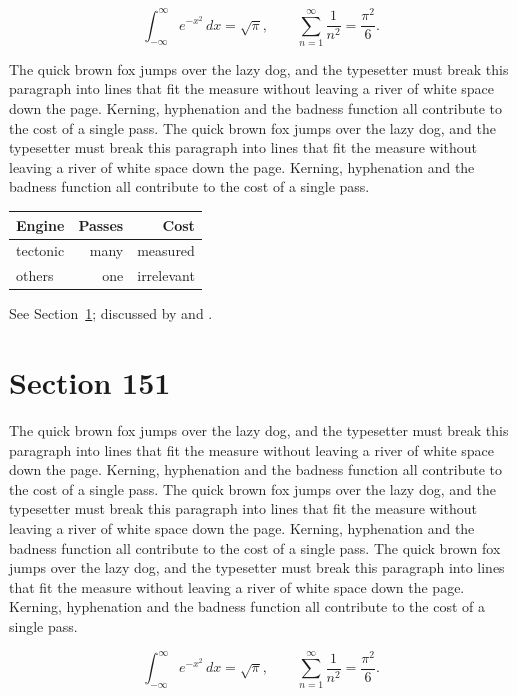 \documentclass{article}
\begin{document}
\begin{equation}\label{eq:150}
\int_{-\infty}^{\infty} e^{-x^{2}}\,dx = \sqrt{\pi}, \qquad
\sum_{n=1}^{\infty} \frac{1}{n^{2}} = \frac{\pi^{2}}{6}.
\end{equation}

The quick brown fox jumps over the lazy dog, and the typesetter must break this paragraph into lines that fit the measure without leaving a river of white space down the page. Kerning, hyphenation and the badness function all contribute to the cost of a single pass. The quick brown fox jumps over the lazy dog, and the typesetter must break this paragraph into lines that fit the measure without leaving a river of white space down the page. Kerning, hyphenation and the badness function all contribute to the cost of a single pass. 

\begin{center}
\begin{tabular}{lrr}
\toprule
Engine & Passes & Cost \\
\midrule
tectonic & many & measured \\
others & one & irrelevant \\
\bottomrule
\end{tabular}
\end{center}

See Section~\ref{sec:151}; discussed by \textcite{k1} and \textcite{l3}.
\section{Section 151}
\label{sec:151}
The quick brown fox jumps over the lazy dog, and the typesetter must break this paragraph into lines that fit the measure without leaving a river of white space down the page. Kerning, hyphenation and the badness function all contribute to the cost of a single pass. The quick brown fox jumps over the lazy dog, and the typesetter must break this paragraph into lines that fit the measure without leaving a river of white space down the page. Kerning, hyphenation and the badness function all contribute to the cost of a single pass. The quick brown fox jumps over the lazy dog, and the typesetter must break this paragraph into lines that fit the measure without leaving a river of white space down the page. Kerning, hyphenation and the badness function all contribute to the cost of a single pass. 

\begin{equation}\label{eq:151}
\int_{-\infty}^{\infty} e^{-x^{2}}\,dx = \sqrt{\pi}, \qquad
\sum_{n=1}^{\infty} \frac{1}{n^{2}} = \frac{\pi^{2}}{6}.
\end{equation}
\end{document}
